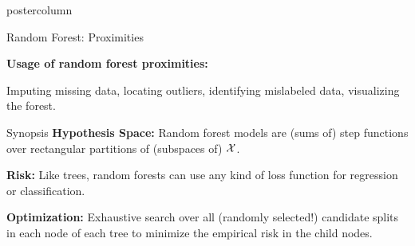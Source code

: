 \documentclass{beamer}
\begin{document}
\begin{frame}[fragile]{}
\begin{columns}
\begin{column}{.31\textwidth}
\begin{beamercolorbox}[center]{postercolumn}
\begin{minipage}{.98\textwidth}
{\begin{myblock}{Random Forest: Proximities}
  \begin{codebox}
  \textbf{Usage of random forest proximities: }
  \end{codebox}
  Imputing missing data, locating outliers, identifying mislabeled data, visualizing the forest.
  
  \end{myblock}
  
  \begin{myblock}{Synopsis}
  \textbf{Hypothesis Space:}
  Random forest models are (sums of) step functions over rectangular partitions of (subspaces of) $\mathcal{X}$.
  \vspace*{1ex}
  
  \textbf{Risk:}
  Like trees, random forests can use any kind of loss function for regression or classification.
  \vspace*{1ex}
  
  \textbf{Optimization:}
  Exhaustive search over all (randomly selected!) candidate splits in each node of each tree to minimize the empirical risk in the child nodes.
  
  \end{myblock}
  }
\end{minipage}
\end{beamercolorbox}
\end{column}

\end{columns}
\end{frame}
\end{document}
